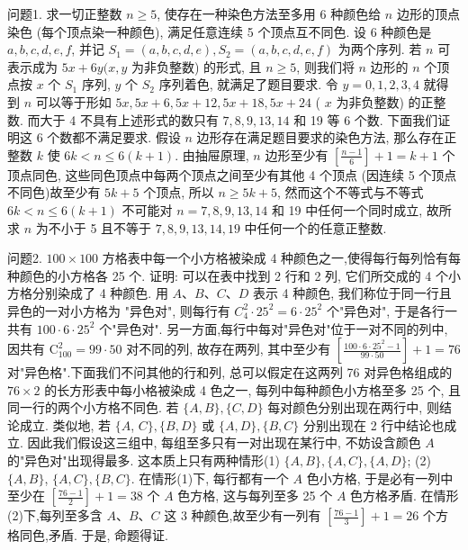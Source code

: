 
问题1. 求一切正整数 $n \geqslant 5$, 使存在一种染色方法至多用 6 种颜色给 $n$ 边形的顶点染色 (每个顶点染一种颜色), 满足任意连续 5 个顶点互不同色.
设 6 种颜色是 $a, b, c, d, e, f$, 并记 $S_1=(a, b, c, d, e), S_2= (a, b, c, d, e, f)$ 为两个序列.
若 $n$ 可表示成为 $5 x+6 y(x, y$ 为非负整数) 的形式, 且 $n \geqslant 5$, 则我们将 $n$ 边形的 $n$ 个顶点按 $x$ 个 $S_1$ 序列, $y$ 个 $S_2$ 序列着色, 就满足了题目要求.
令 $y=0,1,2,3,4$ 就得到 $n$ 可以等于形如 $5 x, 5 x+ 6,5 x+12,5 x+18,5 x+24$ ( $x$ 为非负整数) 的正整数.
而大于 4 不具有上述形式的数只有 $7,8,9,13,14$ 和 19 等 6 个数.
下面我们证明这 6 个数都不满足要求.
假设 $n$ 边形存在满足题目要求的染色方法, 那么存在正整数 $k$ 使 $6 k<n \leqslant 6(k+1)$. 由抽屉原理, $n$ 边形至少有 $\left[\frac{n-1}{6}\right]+1=k+1$ 个顶点同色, 这些同色顶点中每两个顶点之间至少有其他 4 个顶点 (因连续 5 个顶点不同色)故至少有 $5 k+5$ 个顶点, 所以 $n \geqslant 5 k+5$, 然而这个不等式与不等式 $6 k<n \leqslant 6(k+1)$ 不可能对 $n=7,8,9,13,14$ 和 19 中任何一个同时成立, 故所求 $n$ 为不小于 5 且不等于 $7,8,9,13,14,19$ 中任何一个的任意正整数.



问题2. $100 \times 100$ 方格表中每一个小方格被染成 4 种颜色之一,使得每行每列恰有每种颜色的小方格各 25 个.
证明: 可以在表中找到 2 行和 2 列, 它们所交成的 4 个小方格分别染成了 4 种颜色.
用 $A 、 B 、 C 、 D$ 表示 4 种颜色, 我们称位于同一行且异色的一对小方格为 "异色对", 则每行有 $C_4^2 \cdot 25^2=6 \cdot 25^2$ 个"异色对", 于是各行一共有 $100 \cdot 6 \cdot 25^2$ 个"异色对". 另一方面,每行中每对"异色对"位于一对不同的列中, 因共有 $\mathrm{C}_{100}^2=99 \cdot 50$ 对不同的列, 故存在两列, 其中至少有 $\left[\frac{100 \cdot 6 \cdot 25^2-1}{99 \cdot 50}\right]+1=76$ 对"异色格".下面我们不问其他的行和列, 总可以假定在这两列 76 对异色格组成的 $76 \times 2$ 的长方形表中每小格被染成 4 色之一, 每列中每种颜色小方格至多 25 个, 且同一行的两个小方格不同色.
若 $\{A, B\},\{C, D\}$ 每对颜色分别出现在两行中, 则结论成立.
类似地, 若 $\{A$, $C\},\{B, D\}$ 或 $\{A, D\},\{B, C\}$ 分别出现在 2 行中结论也成立.
因此我们假设这三组中, 每组至多只有一对出现在某行中, 不妨设含颜色 $A$ 的"异色对"出现得最多.
这本质上只有两种情形(1) $\{A, B\},\{A, C\},\{A, D\}$; (2) $\{A, B\}$, $\{A, C\},\{B, C\}$. 在情形(1)下, 每行都有一个 $A$ 色小方格, 于是必有一列中至少在 $\left[\frac{76-1}{2}\right]+1=38$ 个 $A$ 色方格, 这与每列至多 25 个 $A$ 色方格矛盾.
在情形(2)下,每列至多含 $A 、 B 、 C$ 这 3 种颜色,故至少有一列有 $\left[\frac{76-1}{3}\right]+1=26$ 个方格同色,矛盾.
于是, 命题得证.




